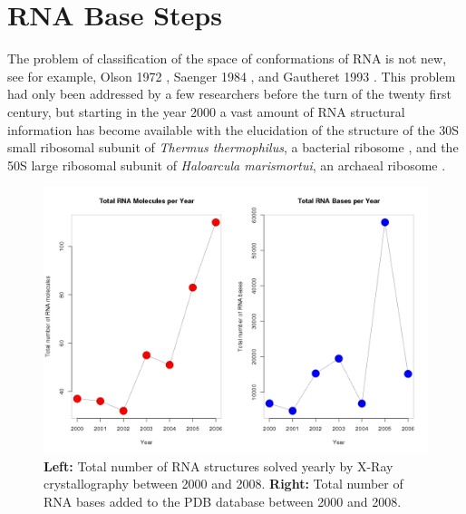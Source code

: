 \chapter{RNA Base Steps}
\label{basesteps} 

The problem of classification of the space of conformations
of RNA  is not  new, see for  example, Olson  1972 \cite{olson1_1972},
Saenger     1984     \cite{saenger1984},     and    Gautheret     1993
\cite{gautheret1993}.  This  problem had only been addressed  by a few
researchers before the turn of  the twenty first century, but starting
in  the year  2000 a  vast amount  of RNA  structural  information has
become  available with  the elucidation  of the  structure of  the 30S
small ribosomal subunit  of \textit{Thermus thermophilus}, a bacterial
ribosome \cite{wimberly2000, schluenzen2000}, and the 50S large
ribosomal subunit of \textit{Haloarcula marismortui}, an archaeal
ribosome \cite{ban2000}.
\begin{figure}[H]
\centering
\includegraphics[scale=0.4]{Chapter2/rna_per_year.png}
\caption{\textbf{Left:} Total  number of RNA  structures solved yearly
  by  X-Ray  crystallography between  2000  and 2008.  \textbf{Right:}
  Total number of RNA bases added to the PDB database between 2000 and
  2008.}
\label{fig:rnainpdb}
\end{figure}

